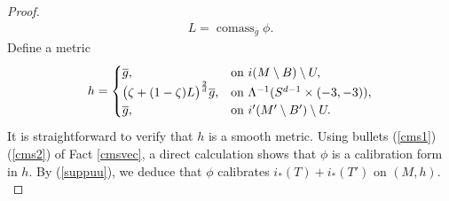 \documentclass[11pt,a4paper]{amsart}
\numberwithin{equation}{section}
\newcommand{\cms}{\operatorname{comass}}
\newcommand{\ov}[1]{\overline{#1}}
\newcommand{\pf}{_\ast}
\newcommand{\m}{^{-1}}
\newcommand{\imb}{i(M\setminus B)}
\newcommand{\imbb}{i'(M'\setminus B')}
\theoremstyle{plain}
\theoremstyle{definition}
\numberwithin{equation}{subsection}
\begin{document}
\begin{proof}
		\begin{align*}
			L=\cms_{\ov{g}}\phi.
		\end{align*} Define a metric
		\begin{align*}
			h=\begin{cases}
				\ov{g},&\textnormal{on }\imb\setminus U,\\
				\big(\zeta+(1-\zeta)L\big)^{\frac{2}{d}}\ov{g},&\textnormal{on }\Lambda\m (S^{d-1}\times(-3,-3)),\\	\ov{g},&\textnormal{on }\imbb\setminus U.
			\end{cases}
		\end{align*}
		It is straightforward to verify that $h$ is a smooth metric.
		Using bullets (\ref{cms1}) (\ref{cms2}) of Fact \ref{cmsvec}, a direct calculation shows that $\phi$ is a calibration form in $h$. By (\ref{suppuu}), we deduce that $\phi$ calibrates $i\pf(T)+i\pf(T')$ on $(M,h).$
	\end{proof}
\end{document}
